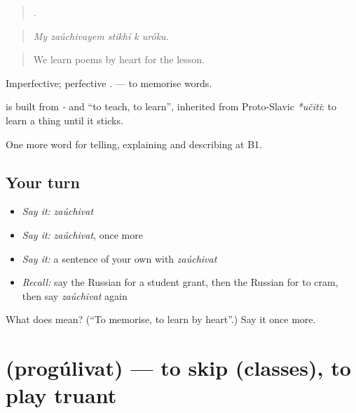 \begin{quote}
    .
\end{quote}

\begin{quote}
\emph{My zaúchivayem stikhí k uróku.}
\end{quote}

\begin{quote}
We learn poems by heart for the lesson.
\end{quote}

Imperfective; perfective \emph{}. \emph{ } — to memorise words.

\begin{cousinweb}
\textbf{} is built from \emph{-} and \emph{} \textquotedblleft{}to teach, to learn\textquotedblright{}, inherited from Proto-Slavic \emph{*učiti}: to learn a thing until it sticks.
\end{cousinweb}

\begin{grammarlens}[title={What you've built}]
One more word for telling, explaining and describing at B1.
\end{grammarlens}

\subsection*{Your turn}
\begin{itemize}
\raggedright
  \item \emph{Say it:} \emph{zaúchivat}
  \item \emph{Say it:} \emph{zaúchivat}, once more
  \item \emph{Say it:} a sentence of your own with \emph{zaúchivat}
  \item \emph{Recall:} say the Russian for a student grant, then the Russian for to cram, then say \emph{zaúchivat} again
\end{itemize}

\begin{tcolorbox}[breakable,colback=teal!4,colframe=teal!35!black,title={Before you move on}]
What does  mean? (\textquotedblleft{}To memorise, to learn by heart\textquotedblright{}.) Say it once more.
\end{tcolorbox}
\section[\texorpdfstring{\ru{прогуливать} (progúlivat)}{прогуливать (progúlivat)}]{ (progúlivat) — to skip (classes), to play truant}

